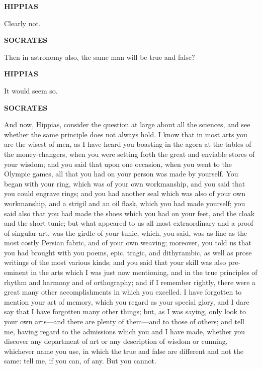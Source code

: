 \documentclass[11pt,letter]{article}
\begin{document}
\par \textbf{HIPPIAS}
\par   Clearly not.

\par \textbf{SOCRATES}
\par   Then in astronomy also, the same man will be true and false?

\par \textbf{HIPPIAS}
\par   It would seem so.

\par \textbf{SOCRATES}
\par   And now, Hippias, consider the question at large about all the sciences, and see whether the same principle does not always hold. I know that in most arts you are the wisest of men, as I have heard you boasting in the agora at the tables of the money-changers, when you were setting forth the great and enviable stores of your wisdom; and you said that upon one occasion, when you went to the Olympic games, all that you had on your person was made by yourself. You began with your ring, which was of your own workmanship, and you said that you could engrave rings; and you had another seal which was also of your own workmanship, and a strigil and an oil flask, which you had made yourself; you said also that you had made the shoes which you had on your feet, and the cloak and the short tunic; but what appeared to us all most extraordinary and a proof of singular art, was the girdle of your tunic, which, you said, was as fine as the most costly Persian fabric, and of your own weaving; moreover, you told us that you had brought with you poems, epic, tragic, and dithyrambic, as well as prose writings of the most various kinds; and you said that your skill was also pre-eminent in the arts which I was just now mentioning, and in the true principles of rhythm and harmony and of orthography; and if I remember rightly, there were a great many other accomplishments in which you excelled. I have forgotten to mention your art of memory, which you regard as your special glory, and I dare say that I have forgotten many other things; but, as I was saying, only look to your own arts—and there are plenty of them—and to those of others; and tell me, having regard to the admissions which you and I have made, whether you discover any department of art or any description of wisdom or cunning, whichever name you use, in which the true and false are different and not the same:  tell me, if you can, of any. But you cannot.
\end{document}
